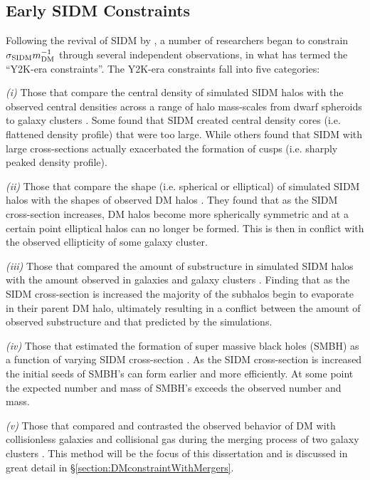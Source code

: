 \subsection{Early SIDM Constraints}\label{section:EarlySIDMconstraints}

Following the revival of SIDM by \citet{Spergel:2000cb}, a number of researchers began to constrain $\sigma_{\rm SIDM}m_{\rm DM}^{-1}$ through several independent observations, in what \citet{Peter:2012vi} has termed the ``Y2K-era constraints''.
The Y2K-era constraints fall into five categories:

\textit{(i)} Those that compare the central density of simulated SIDM halos with the observed central densities across a range of halo mass-scales from dwarf spheroids to galaxy clusters \citep{Hogan:2000ih, Kochanek:2000iw, Yoshida:2000bd, Yoshida:2000gn, Dave:2001hh, Dalcanton:2001jj, Meneghetti:2001en, Colin:2002ku}.
Some found that SIDM created central density cores (i.e. flattened density profile) that were too large.
While others found that SIDM with large cross-sections actually exacerbated the formation of cusps (i.e. sharply peaked density profile).

\textit{(ii)} Those that compare the shape (i.e. spherical or elliptical) of simulated SIDM halos with the shapes of observed DM halos \citep{Yoshida:2000bd, Dave:2001hh, MiraldaEscude:2002ev}.
They found that as the SIDM cross-section increases, DM halos become more spherically symmetric and at a certain point elliptical halos can no longer be formed.
This is then in conflict with the observed ellipticity of some galaxy cluster.

\textit{(iii)} Those that compared the amount of substructure in simulated SIDM halos with the amount observed in galaxies and galaxy clusters \citep{Hogan:2000ih, Yoshida:2000bd, Gnedin:2001gd, Colin:2002ku}.
Finding that as the SIDM cross-section is increased the majority of the subhalos begin to evaporate in their parent DM halo, ultimately resulting in a conflict between the amount of observed substructure and that predicted by the simulations.

\textit{(iv)} Those that estimated the formation of super massive black holes (SMBH) as a function of varying SIDM cross-section \citep{Hennawi:2002kv}.
As the SIDM cross-section is increased the initial seeds of SMBH's can form earlier and more efficiently. 
At some point the expected number and mass of SMBH's exceeds the observed number and mass.

\textit{(v)} Those that compared and contrasted the observed behavior of DM with collisionless galaxies and collisional gas during the merging process of two galaxy clusters \citep{Markevitch:2004dl, Randall:2008hs}.
This method will be the focus of this dissertation and is discussed in great detail in \S\ref{section:DMconstraintWithMergers}.

